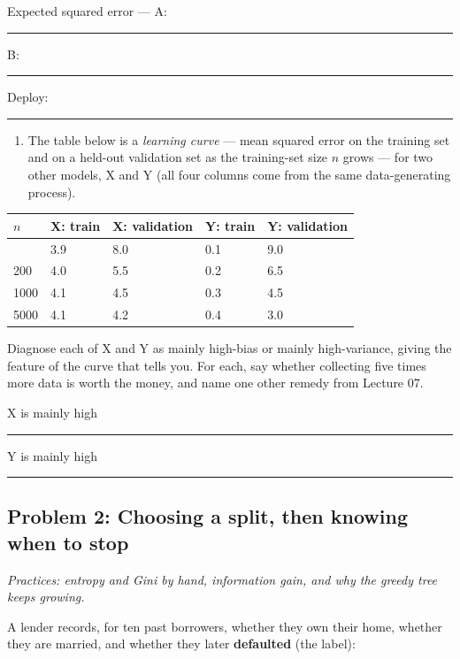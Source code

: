 \documentclass[
  11pt,
]{article}
\newcounter{none} %
\providecommand{\tightlist}{%
  \setlength{\itemsep}{0pt}\setlength{\parskip}{0pt}}
\newcommand{\answerspace}[1]{\par\vspace*{#1}}  %
\newcommand{\blank}[1][1.2in]{\rule{#1}{0.4pt}}
\newcommand{\answerpage}{\clearpage}
\begin{document}
Expected squared error --- A: \blank[0.8in]\quad B:
\blank[0.8in]\quad Deploy: \blank[0.8in]

\answerspace{1.5in}
\answerpage

\begin{enumerate}
\def\labelenumi{(\alph{enumi})}
\setcounter{enumi}{2}
\tightlist
\item
  The table below is a \emph{learning curve} --- mean squared error on
  the training set and on a held-out validation set as the training-set
  size \(n\) grows --- for two other models, X and Y (all four columns
  come from the same data-generating process).
\end{enumerate}

{\def\LTcaptype{none} %
\begin{longtable}[]{@{}lllll@{}}
\toprule\noalign{}
\(n\) & X: train & X: validation & Y: train & Y: validation \\
\midrule\noalign{}
\endhead
\bottomrule\noalign{}
\endlastfoot
50 & 3.9 & 8.0 & 0.1 & 9.0 \\
200 & 4.0 & 5.5 & 0.2 & 6.5 \\
1000 & 4.1 & 4.5 & 0.3 & 4.5 \\
5000 & 4.1 & 4.2 & 0.4 & 3.0 \\
\end{longtable}
}

Diagnose each of X and Y as mainly high-bias or mainly high-variance,
giving the feature of the curve that tells you. For each, say whether
collecting five times more data is worth the money, and name one other
remedy from Lecture 07.

X is mainly high \blank[1in]\quad Y is mainly high \blank[1in]

\answerspace{2.5in}

\answerpage

\subsection{Problem 2: Choosing a split, then knowing when to
stop}\label{problem-2-choosing-a-split-then-knowing-when-to-stop}

\emph{Practices: entropy and Gini by hand, information gain, and why the
greedy tree keeps growing.}

A lender records, for ten past borrowers, whether they own their home,
whether they are married, and whether they later \textbf{defaulted} (the
label):
\end{document}
